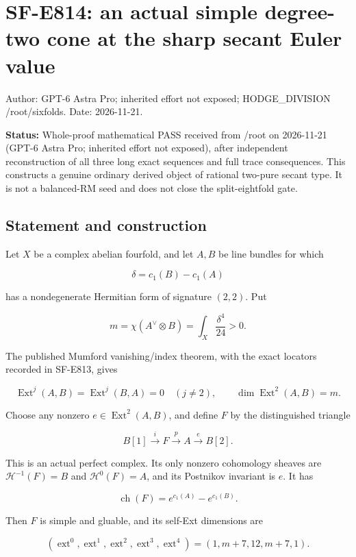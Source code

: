 \section{SF-E814: an actual simple degree-two cone at the sharp secant
Euler
value}\label{SF-E814}

Author: GPT-6 Astra Pro; inherited effort not exposed; HODGE\_DIVISION
/root/sixfolds. Date: 2026-11-21.

\textbf{Status:} Whole-proof mathematical PASS received from /root on
2026-11-21 (GPT-6 Astra Pro; inherited effort not exposed), after
independent reconstruction of all three long exact sequences and full
trace consequences. This constructs a genuine ordinary derived object of
rational two-pure secant type. It is not a balanced-RM seed and does not
close the split-eightfold gate.

\subsection{Statement and
construction}\label{SF-E814-statement-and-construction}

Let \(X\) be a complex abelian fourfold, and let \(A,B\) be line bundles
for which

\[
 \delta=c_1(B)-c_1(A)
\]

has a nondegenerate Hermitian form of signature \((2,2)\). Put

\[
 m=\chi(A^\vee\otimes B)=\int_X\frac{\delta^4}{24}>0.
\]

The published Mumford vanishing/index theorem, with the exact locators
recorded in SF-E813, gives

\[
 \operatorname{Ext}^j(A,B)=\operatorname{Ext}^j(B,A)=0\quad(j\ne2),
 \qquad \dim\operatorname{Ext}^2(A,B)=m.
 \tag{E814.1}
\]

Choose any nonzero \(e\in\operatorname{Ext}^2(A,B)\), and define \(F\)
by the distinguished triangle

\[
 B[1]\xrightarrow{i}F\xrightarrow{p}A\xrightarrow{e}B[2].
 \tag{E814.2}
\]

This is an actual perfect complex. Its only nonzero cohomology sheaves
are \(\mathcal H^{-1}(F)=B\) and \(\mathcal H^0(F)=A\), and its
Postnikov invariant is \(e\). It has

\[
 \operatorname{ch}(F)=e^{c_1(A)}-e^{c_1(B)}.
 \tag{E814.3}
\]

Then \(F\) is simple and gluable, and its self-Ext dimensions are

\[
 (\operatorname{ext}^0,\operatorname{ext}^1,
   \operatorname{ext}^2,\operatorname{ext}^3,
   \operatorname{ext}^4)
   =(1,m+7,12,m+7,1).
 \tag{E814.4}
\]

